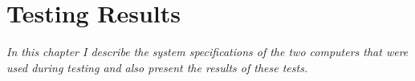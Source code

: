 \chapter{Testing Results}
\textit{In this chapter I describe the system specifications of the two computers that were used during testing and also present the results of these tests.}










